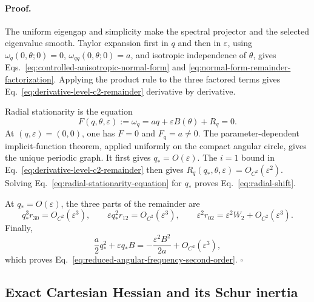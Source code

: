 \paragraph{Proof.}
The uniform eigengap and simplicity make the spectral projector and the
selected eigenvalue smooth.  Taylor expansion first in \(q\) and then in
\(\varepsilon\), using
\(
  \omega_q(0,\theta;0)=0
\),
\(
  \omega_{qq}(0,\theta;0)=a
\), and isotropic independence of \(\theta\), gives
Eqs.~\eqref{eq:controlled-anisotropic-normal-form} and
\eqref{eq:normal-form-remainder-factorization}.  Applying the product rule
to the three factored terms gives
Eq.~\eqref{eq:derivative-level-c2-remainder} derivative by derivative.

Radial stationarity is the equation
\begin{equation}
  F(q,\theta,\varepsilon)
  :=\omega_q
  =aq+\varepsilon B(\theta)+R_q=0.
  \label{eq:radial-stationarity-equation}
\end{equation}
At \((q,\varepsilon)=(0,0)\), one has
\(F=0\) and \(F_q=a\ne0\).  The parameter-dependent
implicit-function theorem, applied uniformly on the compact angular circle,
gives the unique periodic graph.  It first gives \(q_*=O(\varepsilon)\).
The \(i=1\) bound in
Eq.~\eqref{eq:derivative-level-c2-remainder} then gives
\(
  R_q(q_*,\theta,\varepsilon)=O_{C^2}(\varepsilon^2)
\).  Solving Eq.~\eqref{eq:radial-stationarity-equation} for \(q_*\) proves
Eq.~\eqref{eq:radial-shift}.

At \(q_*=O(\varepsilon)\), the three parts of the remainder are
\begin{equation}
  q_*^3r_{30}=O_{C^2}(\varepsilon^3),
  \qquad
  \varepsilon q_*^2r_{12}=O_{C^2}(\varepsilon^3),
  \qquad
  \varepsilon^2r_{02}
  =\varepsilon^2W_2+O_{C^2}(\varepsilon^3).
  \label{eq:remainder-on-radial-graph}
\end{equation}
Finally,
\begin{equation}
  \frac a2q_*^2+\varepsilon q_*B
  =-\frac{\varepsilon^2B^2}{2a}
   +O_{C^2}(\varepsilon^3),
  \label{eq:radial-relaxation-energy}
\end{equation}
which proves Eq.~\eqref{eq:reduced-angular-frequency-second-order}.
\(\square\)

\subsection{Exact Cartesian Hessian and its Schur inertia}

